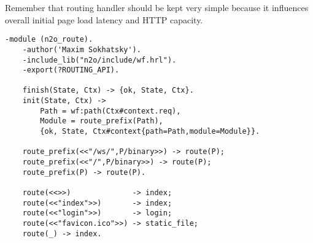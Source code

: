 Remember that routing handler should be kept very simple because it
influences overall initial page load latency and HTTP capacity.

\vspace{1\baselineskip}
\begin{lstlisting}[caption=n2o\_route.erl]
    -module (n2o_route).
    -author('Maxim Sokhatsky').
    -include_lib("n2o/include/wf.hrl").
    -export(?ROUTING_API).

    finish(State, Ctx) -> {ok, State, Ctx}.
    init(State, Ctx) ->
        Path = wf:path(Ctx#context.req),
        Module = route_prefix(Path),
        {ok, State, Ctx#context{path=Path,module=Module}}.

    route_prefix(<<"/ws/",P/binary>>) -> route(P);
    route_prefix(<<"/",P/binary>>) -> route(P);
    route_prefix(P) -> route(P).

    route(<<>>)              -> index;
    route(<<"index">>)       -> index;
    route(<<"login">>)       -> login;
    route(<<"favicon.ico">>) -> static_file;
    route(_) -> index.
\end{lstlisting}
